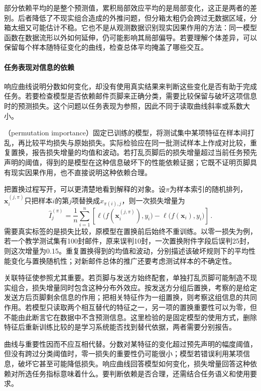 部分依赖平均的是整个预测值，累积局部效应平均的是局部变化，这正是两者的差别。后者降低了不现实组合造成的外推问题，但分箱太粗仍会跨过无数据区域，分箱太细又可能估计不稳。它也不是从观测数据识别现实因果作用的方法：同一模型函数在数据流形以外如何延伸，仍可能影响其局部偏导。若要理解个体差异，可以保留每个样本随特征变化的曲线，检查总体平均掩盖了哪些交互。

\paragraph{任务表现对信息的依赖}

响应曲线说明分数如何变化，却没有使用真实结果来判断这些变化是否有助于完成任务。若要检查模型是否依赖邮件页脚来正确分类，需要比较保留与破坏这项信息时的预测损失。这个问题以任务表现为参照，因此不同于读取曲线斜率或系数大小。

（permutation importance）固定已训练的模型，将测试集中某项特征在样本间打乱，再比较平均损失与原始损失。实际检验应在同一批测试样本上作成对比较，重复置换，报告损失增量的均值和波动。若打乱页脚后的损失增量超过当前任务预先声明的阈值，得到的是模型在这种信息破坏下的性能依赖证据；它既不证明页脚具有现实因果作用，也不直接说明这种依赖合理。

把置换过程写开，可以更清楚地看到解释的对象。设$\pi$为样本索引的随机排列，$\bm{x}_i^{(j,\pi)}$只把样本$i$的第$j$项替换成$x_{\pi(i),j}$，则一次损失增量为
\begin{equation}
 \widehat I_j^{(\pi)}
 =\frac1n\sum_{i=1}^n\left[
 \ell\bigl(f(\bm{x}_i^{(j,\pi)}),y_i\bigr)
 -\ell\bigl(f(\bm{x}_i),y_i\bigr)\right]\, .
 \label{eq:interpretability-permutation}
\end{equation}
需要真实标签的是损失比较，原模型在置换前后始终不重训练。以零一损失为例，若一个教学测试集有100封邮件，原来误判10封，一次置换附件字段后误判25封，则这次增量为0.15。重复置换得到的均值和波动，分别描述该破坏规则下的平均性能变化与置换随机性；对新邮件总体的推广还要考虑测试样本的不确定性。

关联特征使参照尤其重要。若页脚与发送方始终配套，单独打乱页脚可能制造不现实组合，损失增量同时包含这种分布外效应。按发送方分组后置换，考察的是给定发送方后页脚剩余信息的作用；把相关特征作为一组置换，则考察这组信息的共同作用。若模型只读取两个相互替代的特征之一，另一项的置换重要性可以为零，但不能由此断言它在数据中不含预测信息。这里检验的是固定模型的使用方式，删除特征后重新训练比较的是学习系统能否找到替代依据，两者需要分别报告。

曲线与重要性因而不应互相代替。分数对某特征的变化超过预先声明的幅度阈值，但没有跨过分类阈值时，零一损失的重要性仍可能很小；模型若错误利用某项信息，破坏它甚至可能降低损失。响应曲线回答模型如何变化，损失增量回答这种依赖对所选任务指标意味着什么。要判断依赖是否合理，还需结合任务语义和使用要求。

